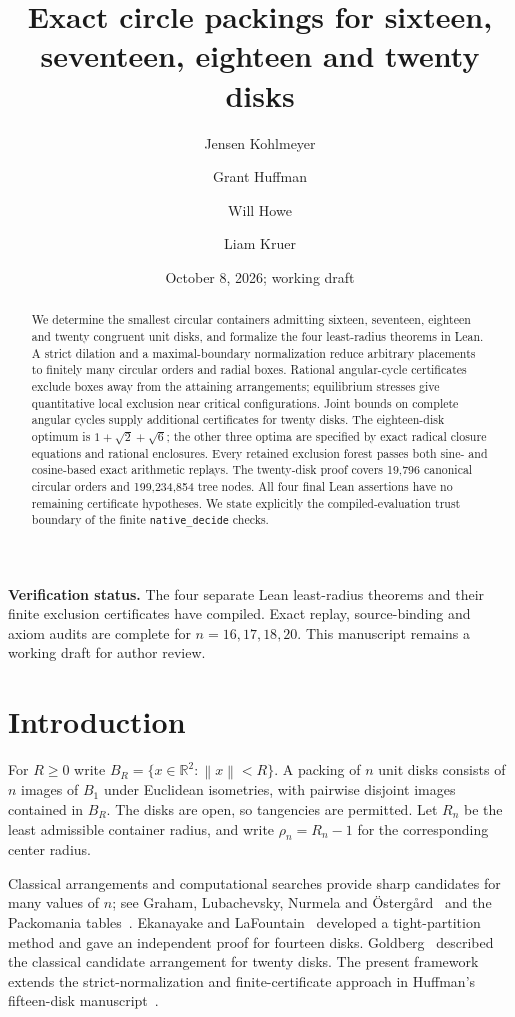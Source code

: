\documentclass[11pt]{amsart}
\title[Exact circle packings for sixteen, seventeen, eighteen and twenty disks]{Exact circle packings for sixteen, seventeen, eighteen and twenty disks}
\author{Jensen Kohlmeyer}
\author{Grant Huffman}
\author{Will Howe}
\author{Liam Kruer}
\date{October 8, 2026; working draft}
\theoremstyle{definition}
\theoremstyle{remark}
\newcommand{\R}{\mathbb R}
\newcommand{\norm}[1]{\left\lVert #1\right\rVert}
\begin{document}
\begin{abstract}
We determine the smallest circular containers admitting sixteen, seventeen,
eighteen and twenty congruent unit disks, and formalize the four least-radius
theorems in Lean. A strict dilation and a maximal-boundary normalization
reduce arbitrary placements to finitely many circular orders and radial
boxes. Rational angular-cycle certificates exclude boxes away from the
attaining arrangements; equilibrium stresses give quantitative local
exclusion near critical configurations. Joint bounds on complete angular
cycles supply additional certificates for twenty disks. The eighteen-disk
optimum is $1+\sqrt2+\sqrt6$; the other three optima are specified by exact
radical closure equations and rational enclosures. Every retained
exclusion forest passes both sine- and cosine-based exact arithmetic
replays. The twenty-disk proof covers 19,796 canonical circular orders and
199,234,854 tree nodes. All four final Lean assertions have no remaining
certificate hypotheses. We state explicitly the compiled-evaluation trust
boundary of the finite \texttt{native\_decide} checks.
\end{abstract}
\maketitle

\noindent\textbf{Verification status.}
The four separate Lean least-radius theorems and their finite exclusion
certificates have compiled. Exact replay, source-binding and axiom audits
are complete for $n=16,17,18,20$. This manuscript remains a working draft
for author review.

\section{Introduction}
For $R\ge0$ write $B_R=\{x\in\R^2:\norm{x}<R\}$.
A packing of $n$ unit disks consists of $n$ images of $B_1$ under Euclidean
isometries, with pairwise disjoint images contained in $B_R$. The disks are
open, so tangencies are permitted. Let $R_n$ be the least admissible container
radius, and write $\rho_n=R_n-1$ for the corresponding center radius.

Classical arrangements and computational searches provide sharp candidates
for many values of $n$; see Graham, Lubachevsky, Nurmela and
\"Osterg\aa rd~\cite{graham} and the Packomania tables~\cite{specht}.
Ekanayake and LaFountain~\cite{ekanayake} developed a tight-partition method
and gave an independent proof for fourteen disks. Goldberg~\cite{goldberg}
described the classical candidate arrangement for twenty disks.
The present framework extends the strict-normalization and finite-certificate
approach in Huffman's fifteen-disk manuscript~\cite{huffman}.
\end{document}
